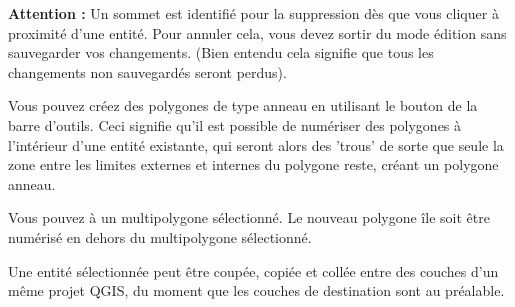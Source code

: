 \textbf{Attention :} Un sommet est identifié pour la suppression dès que vous cliquer à proximité d'une entité. Pour annuler cela, vous devez sortir du mode édition sans sauvegarder vos changements. (Bien entendu cela signifie que tous les changements non sauvegardés seront perdus).


Vous pouvez créez des polygones de type anneau en utilisant le bouton  de la barre d'outils. Ceci signifie qu'il est possible de numériser des polygones à l'intérieur d'une entité existante, qui seront alors des 'trous' de sorte que seule la zone entre les limites externes et internes du polygone reste, créant un polygone anneau.



Vous pouvez  à un multipolygone sélectionné. Le nouveau polygone île soit être numérisé en dehors du multipolygone sélectionné.


Une entité sélectionnée peut être coupée, copiée et collée entre des couches d'un même projet QGIS, du moment que les couches de destination sont  au préalable.

